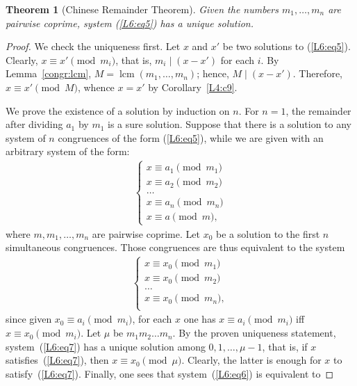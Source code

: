 \documentclass[12pt,notitlepage]{article}
\theoremstyle{plain}
\newtheorem{thm}{Theorem}[section]
\theoremstyle{definition}
\theoremstyle{plain}
\newcommand{\1}{\mathbf{1}}
\newcommand{\0}{\mathbf{0}}
\newcommand{\dvd}{\mathop{\mid}}
\DeclareMathOperator{\lcm}{lcm}
\begin{document}
\begin{thm}[Chinese Remainder Theorem]\label{L6:t_chinese}
Given the numbers $m_1, \ldots, m_n$ are pairwise coprime, system (\ref{L6:eq5}) has a unique solution.
\end{thm}
\begin{proof}
We check the uniqueness first. Let $x$ and $x'$ be two solutions to (\ref{L6:eq5}). Clearly, $x \equiv x' \pmod {m_i}$, that is, $m_i \dvd (x - x')$ for each $i$. By Lemma~\ref{congr:lcm}, $M = \lcm(m_1, \ldots, m_n)$; hence, $M \dvd (x - x')$. Therefore, $x \equiv x' \pmod M$, whence $x = x'$ by Corollary~\ref{L4:c9}.

We prove the existence of a solution by induction on $n$. For $n = 1$, the remainder after dividing $a_1$ by $m_1$ is a sure solution. Suppose that there is a solution to any system of $n$ congruences of the form (\ref{L6:eq5}), while we are given with an arbitrary system of the form:
\begin{equation}\label{L6:eq6}
\begin{array}{l}
\begin{cases}
	 x \equiv a_1 \pmod {m_1}\\
	 x \equiv a_2 \pmod {m_2}\\
	 \ldots\\
	 x \equiv a_n \pmod {m_n}\\
	 x \equiv a \pmod {m},
\end{cases}
\end{array}
\end{equation}
where $m, m_1, \ldots, m_n$ are pairwise coprime.
Let $x_0$ be a solution to the first $n$ simultaneous congruences. Those congruences are thus equivalent to the system
\begin{equation}\label{L6:eq7}
\begin{array}{l}
\begin{cases}
	 x \equiv x_0 \pmod {m_1}\\
	 x \equiv x_0 \pmod {m_2}\\
	 \ldots\\
	 x \equiv x_0 \pmod {m_n},\\
\end{cases}
\end{array}
\end{equation}
since given $x_0 \equiv a_i \pmod{m_i}$, for each $x$ one has $x \equiv a_i \pmod {m_i}$ iff $x \equiv x_0 \pmod {m_i}$. Let $\mu$ be $m_1 m_2 \ldots m_n$. By the proven uniqueness statement, system~(\ref{L6:eq7}) has a unique solution among $0, 1, \ldots, \mu - 1$, that is, if $x$ satisfies~(\ref{L6:eq7}), then $x \equiv x_0 \pmod \mu$. Clearly, the latter is enough for $x$ to satisfy~(\ref{L6:eq7}). Finally, one sees that system~(\ref{L6:eq6}) is equivalent to

\end{proof}
\end{document}
